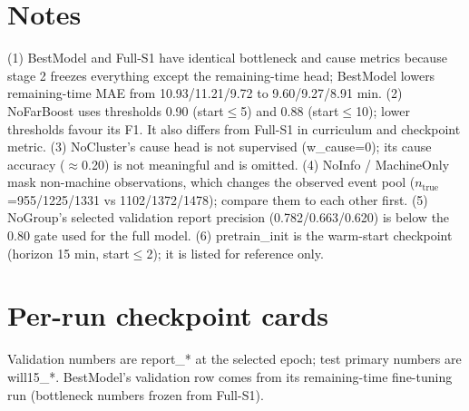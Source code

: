 \documentclass[9pt,a4paper,twocolumn]{extarticle}
\begin{document}
\section*{Notes}
\footnotesize
(1) BestModel and Full-S1 have identical bottleneck and cause metrics because stage 2 freezes everything except the remaining-time head; BestModel lowers remaining-time MAE from 10.93/11.21/9.72 to 9.60/9.27/8.91 min.
(2) NoFarBoost uses thresholds 0.90 (start$\le$5) and 0.88 (start$\le$10); lower thresholds favour its F1. It also differs from Full-S1 in curriculum and checkpoint metric.
(3) NoCluster's cause head is not supervised (w\_cause=0); its cause accuracy ($\approx$0.20) is not meaningful and is omitted.
(4) NoInfo / MachineOnly mask non-machine observations, which changes the observed event pool ($n_{\mathrm{true}}$=955/1225/1331 vs 1102/1372/1478); compare them to each other first.
(5) NoGroup's selected validation report precision (0.782/0.663/0.620) is below the 0.80 gate used for the full model.
(6) pretrain\_init is the warm-start checkpoint (horizon 15 min, start$\le$2); it is listed for reference only.


\section*{Per-run checkpoint cards}

{\small Validation numbers are report\_* at the selected epoch; test primary numbers are will15\_*. BestModel's validation row comes from its remaining-time fine-tuning run (bottleneck numbers frozen from Full-S1).}
\end{document}
